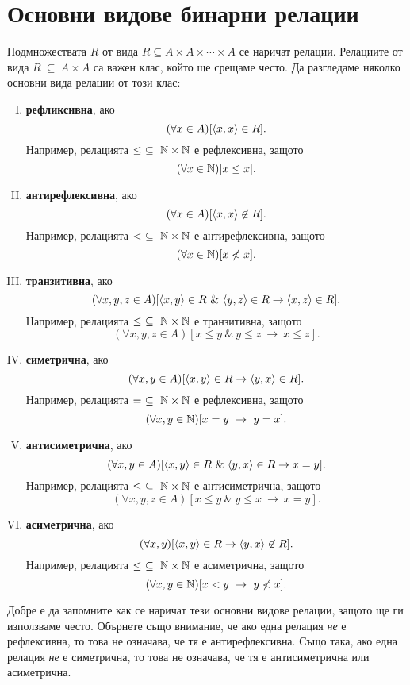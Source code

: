 \section{Основни видове бинарни релации}
Подмножествата $R$ от вида $R \subseteq A\times A\times\cdots\times A$ се наричат релации.
Релациите от вида $R\ \subseteq\ A\times A$ са важен клас, който ще срещаме често.
Да разгледаме няколко основни вида релации от този клас:
\begin{enumerate}[I)]
\item
  {\bf рефликсивна}, ако
  \[(\forall x\in A)[\langle{x,x}\rangle\in R].\]
  Например, релацията $\leq\ \subseteq\ \Nat\times\Nat$ е рефлексивна, защото
  \[(\forall x\in \mathbb{N})[x \leq x].\]
\item
  {\bf антирефлексивна}, ако
  \[(\forall x\in A)[\langle{x,x}\rangle\not\in R].\]
  Например, релацията $<\ \subseteq\ \Nat\times\Nat$ е антирефлексивна, защото
  \[(\forall x\in \mathbb{N})[x \not< x].\]
\item
  {\bf транзитивна}, ако
  \[(\forall x,y,z\in A)[\pair{x,y}\in R\ \&\ \pair{y,z}\in R \rightarrow \pair{x,z}\in R].\]
  Например, релацията $\leq\ \subseteq\ \Nat\times\Nat$ е транзитивна, защото
  \[(\forall x,y,z\in A)[x \leq y\ \&\ y \leq z\ \rightarrow\ x\leq z].\]
\item
  {\bf симетрична}, ако
  \[(\forall x,y\in A)[\langle{x,y}\rangle\in R \rightarrow \langle{y,x}\rangle\in R].\]
  Например, релацията $=\ \subseteq\ \mathbb{N}\times\mathbb{N}$ е рефлексивна, защото
  \[(\forall x,y\in \Nat)[x = y\ \rightarrow\ y = x].\]
\item
  {\bf антисиметрична}, ако
  \[(\forall x,y\in A)[\pair{x,y}\in R\ \&\ \pair{y,x}\in R \rightarrow x = y].\]
  Например, релацията $\leq\ \subseteq\ \Nat\times\Nat$ е антисиметрична, защото
  \[(\forall x,y,z\in A)[x \leq y\ \&\ y \leq x\ \rightarrow\ x = y].\]
\item
  {\bf асиметрична}, ако
  \[(\forall x,y)[\langle{x,y}\rangle\in R \rightarrow \langle{y,x}\rangle\not\in R].\]
  Например, релацията $\leq\ \subseteq\ \Nat\times\Nat$ е асиметрична, защото
  \[(\forall x,y\in \mathbb{N})[x < y\ \rightarrow\ y \not< x].\]
\end{enumerate}

\begin{remark}
  Добре е да запомните как се наричат тези основни видове релации, защото ще ги използваме често.
  Обърнете също внимание, че ако една релация {\em не} е рефлексивна, то това не означава, че тя е антирефлексивна.
  Също така, ако една релация {\em не} е симетрична, то това не означава, че тя е антисиметрична или асиметрична.
\end{remark}

